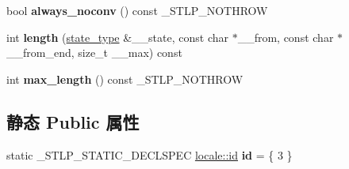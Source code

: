 \begin{DoxyCompactItemize}
bool {\bfseries always\+\_\+noconv} () const \+\_\+\+S\+T\+L\+P\+\_\+\+N\+O\+T\+H\+R\+OW
\item 
\mbox{\label{classcodecvt_3_01char_00_01char_00_01mbstate__t_01_4_ae880ad8eede1a2609ca87f2c0768bffa}} 
int {\bfseries length} (\hyperlink{struct____mbstate__t}{state\+\_\+type} \&\+\_\+\+\_\+state, const char $\ast$\+\_\+\+\_\+from, const char $\ast$\+\_\+\+\_\+from\+\_\+end, size\+\_\+t \+\_\+\+\_\+max) const
\item 
\mbox{\label{classcodecvt_3_01char_00_01char_00_01mbstate__t_01_4_a8785d53861376013032893a464d6835f}} 
int {\bfseries max\+\_\+length} () const \+\_\+\+S\+T\+L\+P\+\_\+\+N\+O\+T\+H\+R\+OW
\end{DoxyCompactItemize}
\subsection*{静态 Public 属性}
\begin{DoxyCompactItemize}
\item 
\mbox{\label{classcodecvt_3_01char_00_01char_00_01mbstate__t_01_4_aa46c60dcbe966a7ac37e01da3bc3dd8f}} 
static \+\_\+\+S\+T\+L\+P\+\_\+\+S\+T\+A\+T\+I\+C\+\_\+\+D\+E\+C\+L\+S\+P\+EC \hyperlink{classlocale_1_1id}{locale\+::id} {\bfseries id} = \{ 3 \}
\end{DoxyCompactItemize}
